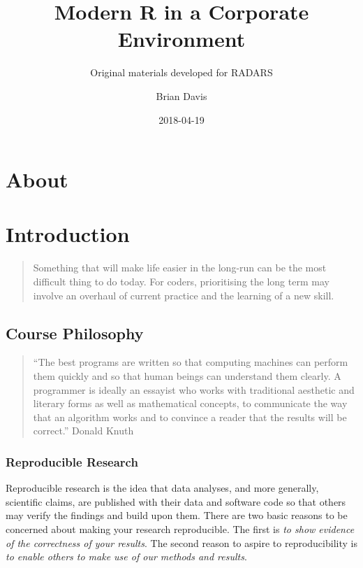 \documentclass[]{book}
\title{Modern R in a Corporate Environment}
\subtitle{Original materials developed for RADARS}
\author{Brian Davis}
\date{2018-04-19}
\theoremstyle{definition}
\theoremstyle{definition}
\theoremstyle{definition}
\theoremstyle{remark}
\begin{document}
\maketitle

{
\setcounter{tocdepth}{1}
\tableofcontents
}
\chapter*{About}\label{about}

\chapter{Introduction}\label{introduction}

\begin{quote}
Something that will make life easier in the long-run can be the most
difficult thing to do today. For coders, prioritising the long term may
involve an overhaul of current practice and the learning of a new skill.
\end{quote}

\section{Course Philosophy}\label{course-philosophy}

\begin{quote}
``The best programs are written so that computing machines can perform
them quickly and so that human beings can understand them clearly. A
programmer is ideally an essayist who works with traditional aesthetic
and literary forms as well as mathematical concepts, to communicate the
way that an algorithm works and to convince a reader that the results
will be correct.'' Donald Knuth
\end{quote}

\subsection{Reproducible Research}\label{reproducible-research}

Reproducible research is the idea that data analyses, and more
generally, scientific claims, are published with their data and software
code so that others may verify the findings and build upon them. There
are two basic reasons to be concerned about making your research
reproducible. The first is \emph{to show evidence of the correctness of
your results}. The second reason to aspire to reproducibility is
\emph{to enable others to make use of our methods and results}.
\end{document}
